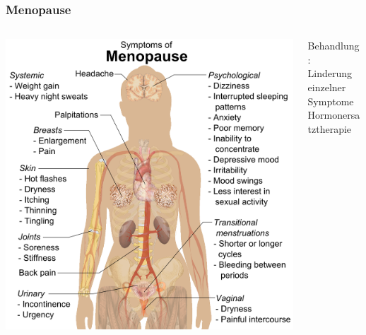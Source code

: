 \documentclass{beamer}
\begin{document}
\begin{frame}
\frametitle{Menopause}

\begin{columns}[c]

\begin{column}{7cm}

\begin{center}
 \includegraphics[width=\textwidth]{menopause.png}
\end{center}



\end{column}

\pause

\begin{column}{4cm}

Behandlung: \\[0.2 cm]


Linderung einzelner Symptome \\
Hormonersatztherapie


\end{column}


\end{columns}



 \end{frame}
\end{document}
